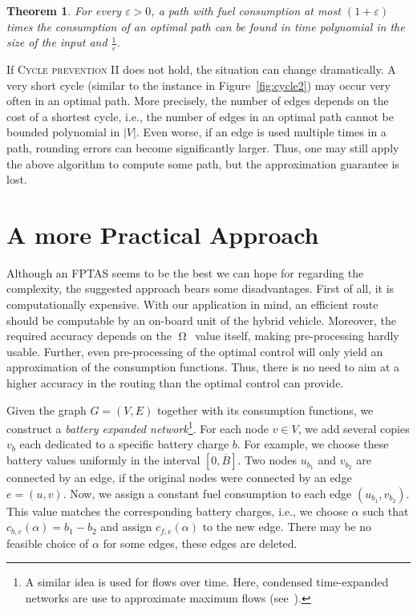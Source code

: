 \documentclass[a4paper]{scrartcl}
\newcommand{\OPT}{\ensuremath{\operatorname{\Omega}}}
\renewcommand{\bar}[1]{\overline{#1}}
\newtheorem{theorem}{Theorem}
\begin{document}
\begin{theorem}
 For every $\varepsilon>0$, a path with fuel consumption at most $(1+\varepsilon)$ times the consumption of an optimal path can be found in time polynomial in the size of the input and $\frac{1}{\varepsilon}$.
\end{theorem}

If \textsc{Cycle prevention II} does not hold, the situation can change dramatically. A very short cycle (similar to the instance in Figure~\ref{fig:cycle2}) may occur very often in an optimal path. More precisely, the number of edges depends on the cost of a shortest cycle, i.e., the number of edges in an optimal path cannot be bounded polynomial in $|V|$. Even worse, if an edge is used multiple times in a path, rounding errors can become significantly larger. Thus, one may still apply the above algorithm to compute some path, but the approximation guarantee is lost.  


\section{A more Practical Approach}

Although an FPTAS seems to be the best we can hope for regarding the complexity, the suggested approach bears some disadvantages. First of all, it is computationally expensive. With our application in mind, an efficient route should be computable by an on-board unit of the hybrid vehicle. Moreover, the required accuracy depends on the \OPT\ value itself, making pre-processing hardly usable.  Further, even pre-processing of the optimal control will only yield an approximation of the consumption functions. Thus, there is no need to aim at a higher accuracy in the routing than the optimal control can provide. 


Given the graph $G=(V,E)$ together with its consumption functions, we construct a \emph{battery expanded network}\footnote{A similar idea is used for flows over time. Here, condensed time-expanded networks are use to approximate maximum flows (see~\cite{FleischerSkutella07}).}.
For each node $v\in V$, we add several copies $v_b$ each dedicated to a specific battery charge $b$. For example, we choose these battery values uniformly in the interval $[0,\bar B]$. Two nodes $u_{b_1}$ and $v_{b_2}$ are connected by an edge, if the original nodes were connected by an edge $e=(u,v)$. Now, we assign a constant fuel consumption to each edge $(u_{b_1},v_{b_2})$. This value matches the corresponding battery charges, i.e., we choose $\alpha$ such that $c_{b,e}(\alpha)=b_1-b_2$ and assign $c_{f,e}(\alpha)$ to the new edge. There may be no feasible choice of $\alpha$ for some edges, these edges are deleted. 
\end{document}
